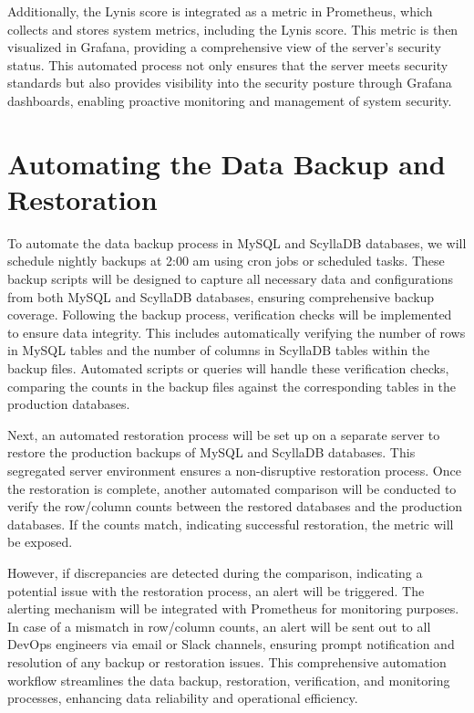 \documentclass[12pt,a4paper,oneside]{report}
\begin{document}
Additionally, the Lynis score is integrated as a metric in Prometheus, which collects and stores system metrics, including the Lynis score. This metric is then visualized in Grafana, providing a comprehensive view of the server's security status. This automated process not only ensures that the server meets security standards but also provides visibility into the security posture through Grafana dashboards, enabling proactive monitoring and management of system security.

 \section{Automating the Data Backup and Restoration}
\par To automate the data backup process in MySQL and ScyllaDB databases, we will schedule nightly backups at 2:00 am using cron jobs or scheduled tasks. These backup scripts will be designed to capture all necessary data and configurations from both MySQL and ScyllaDB databases, ensuring comprehensive backup coverage. Following the backup process, verification checks will be implemented to ensure data integrity. This includes automatically verifying the number of rows in MySQL tables and the number of columns in ScyllaDB tables within the backup files. Automated scripts or queries will handle these verification checks, comparing the counts in the backup files against the corresponding tables in the production databases.

Next, an automated restoration process will be set up on a separate server to restore the production backups of MySQL and ScyllaDB databases. This segregated server environment ensures a non-disruptive restoration process. Once the restoration is complete, another automated comparison will be conducted to verify the row/column counts between the restored databases and the production databases. If the counts match, indicating successful restoration, the metric will be exposed.

However, if discrepancies are detected during the comparison, indicating a potential issue with the restoration process, an alert will be triggered. The alerting mechanism will be integrated with Prometheus for monitoring purposes. In case of a mismatch in row/column counts, an alert will be sent out to all DevOps engineers via email or Slack channels, ensuring prompt notification and resolution of any backup or restoration issues. This comprehensive automation workflow streamlines the data backup, restoration, verification, and monitoring processes, enhancing data reliability and operational efficiency.
\end{document}
